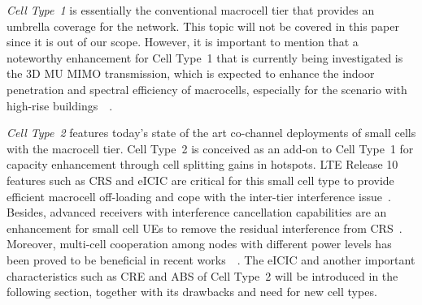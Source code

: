 \documentclass{IEEEtran}
\begin{document}
\emph{Cell Type~1} is essentially the conventional macrocell tier that provides an umbrella coverage for the network.
This topic will not be covered in this paper since it is out of our scope.
However, it is important to mention that a noteworthy enhancement for Cell Type~1 that is currently being investigated is the \ac{3D} \ac{MU} \ac{MIMO} transmission,
which is expected to enhance the indoor penetration and spectral efficiency of macrocells, especially for the scenario with high-rise buildings~\cite{6525612}~\cite{6966194}.


\emph{Cell Type~2} features today's state of the art co-channel deployments of small cells with the macrocell tier.
Cell Type~2 is conceived as an add-on to Cell Type~1 for capacity enhancement through cell splitting gains in hotspots.
\ac{LTE} Release 10 features such as \ac{CRS} and \ac{eICIC} are critical for this small cell type
to provide efficient macrocell off-loading and cope with the inter-tier interference issue~\cite{Lopez_perez2011HetNet}.
Besides, advanced receivers with interference cancellation capabilities are an enhancement for small cell \acp{UE} to remove the residual interference from CRS~\cite{6692396}. Moreover, multi-cell cooperation among nodes with different power levels has been proved to be beneficial in recent works~\cite{6692101}~\cite{6965874}.
The eICIC and another important characteristics such as \ac{CRE} and \ac{ABS} of Cell Type~2 will be introduced in the following section,
together with its drawbacks and need for new cell types.
\end{document}

